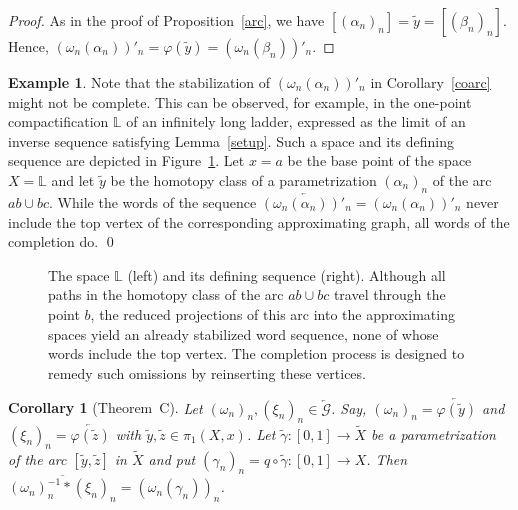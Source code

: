 \documentclass{amsart}
\newtheorem{corollary}[theorem]{Corollary}
\theoremstyle{definition}
\newtheorem{example}[theorem]{Example}
\theoremstyle{remark}
\numberwithin{equation}{section}
\begin{document}
\begin{proof} As in the proof of Proposition~\ref{arc}, we have $[(\alpha_n)_n]=\tilde{y}=[(\beta_n)_n]$. Hence,
$(\omega_n(\alpha_n))'_n=
\varphi(\tilde{y})=(\omega_n(\beta_n))'_n$.
\end{proof}

\begin{example}\label{L-space} Note that the stabilization of $(\omega_n(\alpha_n))'_n$ in Corollary~\ref{coarc} might not be complete. This can be observed, for example, in the one-point compactification $\mathbb{L}$ of an infinitely long ladder, expressed as the limit of an inverse sequence satisfying Lemma~\ref{setup}. Such a space and its defining sequence are depicted in Figure~\ref{L-picture}.
Let $x=a$ be the base point of the space $X=\mathbb{L}$  and let  $\tilde{y}$ be the homotopy class of a parametrization $(\alpha_n)_n$ of the arc $ab\cup bc$. While the words of the sequence $\overleftarrow{(\omega_n(\alpha_n))'_n}=(\omega_n(\alpha_n))'_n$ never include the top vertex of the corresponding approximating graph, all words of the completion do. \qed
\begin{figure}[h]
\caption{\label{L-picture} The space $\mathbb{L}$ (left) and its defining sequence (right). Although all paths in the homotopy class of the arc $ab\cup bc$ travel through the point $b$, the reduced projections of this arc into the approximating spaces yield an already stabilized word sequence, none of whose words include the top vertex. The completion process is designed to remedy such omissions by reinserting these vertices.}
\end{figure}

\end{example}

\begin{corollary}[Theorem~C]\label{differences}
  Let $(\omega_n)_n,(\xi_n)_n \in \overleftarrow{\mathcal G}$. Say, $(\omega_n)_n=\overleftarrow{\varphi(\tilde{y})}$ and $(\xi_n)_n=\overleftarrow{\varphi(\tilde{z})}$ with $\tilde{y},\tilde{z}\in \pi_1(X,x)$. Let $\tilde{\gamma}:[0,1]\rightarrow \tilde{X}$ be a parametrization of the arc $[\tilde{y},\tilde{z}]$ in $\tilde{X}$ and put $(\gamma_n)_n=q\circ \tilde{\gamma}:[0,1]\rightarrow X$. Then $\overline{(\omega_n)_n^{-1}\ast (\xi_n)_n}=(\omega_n(\gamma_n))_n$.
\end{corollary}
\end{document}
